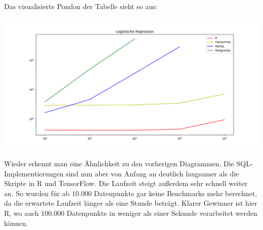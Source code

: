 Das visualisierte Pondon der Tabelle sieht so aus:

\includegraphics[width=\textwidth]{logisticRegressionBenchmark}

Wieder erkennt man eine Ähnlichkeit zu den vorherigen Diagrammen. Die SQL-Implementierungen sind nun aber von Anfang an deutlich langsamer als die Skripte in R und TensorFlow. Die Laufzeit steigt außerdem sehr schnell weiter an. So wurden für ab $10.000$ Datenpunkte gar keine Benchmarks mehr berechnet, da die erwartete Laufzeit länger als eine Stunde beträgt. Klarer Gewinner ist hier R, wo auch $100.000$ Datenpunkte in weniger als einer Sekunde verarbeitet werden können.
